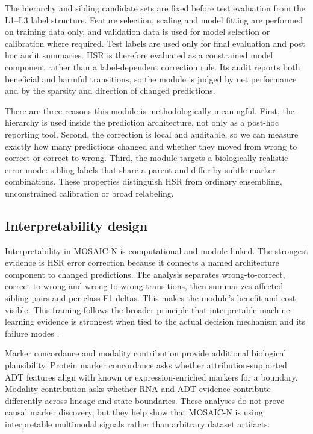 \documentclass[unnumsec,webpdf,contemporary,large,numbered]{oup-authoring-template}
\begin{document}
The hierarchy and sibling candidate sets are fixed before test evaluation from the L1--L3 label structure. Feature selection, scaling and model fitting are performed on training data only, and validation data is used for model selection or calibration where required. Test labels are used only for final evaluation and post hoc audit summaries. HSR is therefore evaluated as a constrained model component rather than a label-dependent correction rule. Its audit reports both beneficial and harmful transitions, so the module is judged by net performance and by the sparsity and direction of changed predictions.

There are three reasons this module is methodologically meaningful. First, the hierarchy is used inside the prediction architecture, not only as a post-hoc reporting tool. Second, the correction is local and auditable, so we can measure exactly how many predictions changed and whether they moved from wrong to correct or correct to wrong. Third, the module targets a biologically realistic error mode: sibling labels that share a parent and differ by subtle marker combinations. These properties distinguish HSR from ordinary ensembling, unconstrained calibration or broad relabeling.

\subsection{Interpretability design}

Interpretability in MOSAIC-N is computational and module-linked. The strongest evidence is HSR error correction because it connects a named architecture component to changed predictions. The analysis separates wrong-to-correct, correct-to-wrong and wrong-to-wrong transitions, then summarizes affected sibling pairs and per-class F1 deltas. This makes the module's benefit and cost visible. This framing follows the broader principle that interpretable machine-learning evidence is strongest when tied to the actual decision mechanism and its failure modes \citep{ribeiro2016,sundararajan2017,montavon2019,samek2021,lundberg2017}.

Marker concordance and modality contribution provide additional biological plausibility. Protein marker concordance asks whether attribution-supported ADT features align with known or expression-enriched markers for a boundary. Modality contribution asks whether RNA and ADT evidence contribute differently across lineage and state boundaries. These analyses do not prove causal marker discovery, but they help show that MOSAIC-N is using interpretable multimodal signals rather than arbitrary dataset artifacts.
\end{document}
